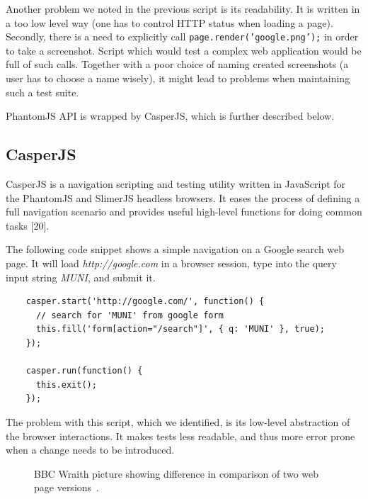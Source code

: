 \documentclass[11pt,oneside,final]{fithesis2}
\begin{document}
    Another problem we noted in the previous script is its readability. It is written in a too low level way (one has to control HTTP status when loading a page). Secondly, there is a need
    to explicitly call \texttt{page.render('google.png');} in order to take a screenshot. Script which would test a complex web application would be full of such calls. Together with a poor
    choice of naming created screenshots (a user has to choose a name wisely), it might lead to problems when maintaining such a test suite.
    
    PhantomJS API is wrapped by CasperJS, which is further described below.
    
    \subsection{CasperJS}
    \label{subsec:casperJS}
    CasperJS is a navigation scripting and testing utility written in JavaScript for the PhantomJS and SlimerJS headless browsers. It eases the process of defining a full navigation scenario 
    and provides useful high-level functions for doing common tasks [20].
    
    The following code snippet shows a simple navigation on a Google search web page. It will load \textit{http://google.com} in a browser session, 
    type into the query input string \textit{MUNI}, and submit it.
    
    \begin{verbatim}
    casper.start('http://google.com/', function() {
      // search for 'MUNI' from google form
      this.fill('form[action="/search"]', { q: 'MUNI' }, true);
    });
   
    casper.run(function() {
      this.exit();
    });
    \end{verbatim}
    
    The problem with this script, which we identified, is its low-level abstraction of the browser interactions. It makes tests less readable, and thus more error prone when a change
    needs to be introduced.
    
    \begin{figure}[!htb]
    \begin{center}
    \leavevmode
    \centerline{}
    \end{center}
    \caption{BBC Wraith picture showing difference in comparison of two web page versions~\citep{bbc_wraith_diff}.}
    \label{fig:bbcWraithDiff} 
  \end{figure}
\end{document}
